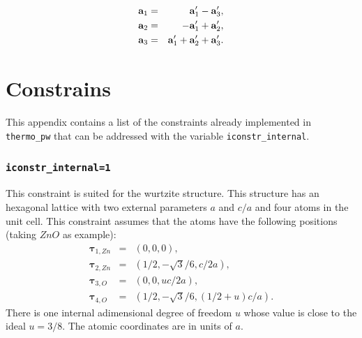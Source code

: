 \documentclass[12pt,a4paper,twoside]{report}
\begin{document}
\begin{eqnarray}
{\bf a}_1&=& {\bf a}_1' - {\bf a}_3', \\
{\bf a}_2&=& - {\bf a}_1' + {\bf a}_2', \\
{\bf a}_3&=& {\bf a}_1' + {\bf a}_2' + {\bf a}_3'.
\end{eqnarray}

\appendix
{\color{dark-blue}\chapter{Constrains}}
\color{black}

This appendix contains a list of the constraints already implemented in
\texttt{thermo\_pw} that can be addressed with the variable
\texttt{iconstr\_internal}.

{\color{web-blue}\subsection{\texttt{iconstr\_internal=1}}}
\color{black}
This constraint is suited for the wurtzite structure. This structure has
an hexagonal lattice with two external parameters $a$ and $c/a$ and 
four atoms in the unit cell. This constraint assumes that the atoms have
the following positions (taking $ZnO$ as example):
\begin{eqnarray}
\boldsymbol{\tau}_{1,Zn} &=& ( 0, 0, 0), \nonumber \\
\boldsymbol{\tau}_{2,Zn} &=& ( 1/2, -\sqrt{3}/6, c/2a), \nonumber \\
\boldsymbol{\tau}_{3,O} &=& ( 0, 0, u c/2a), \nonumber \\
\boldsymbol{\tau}_{4,O} &=& ( 1/2, -\sqrt{3}/6, (1/2 + u)c/a). \nonumber 
\end{eqnarray}
There is one internal adimensional degree of freedom $u$ whose value is 
close to the ideal $u=3/8$. The atomic coordinates are in units of $a$.
\end{document}

